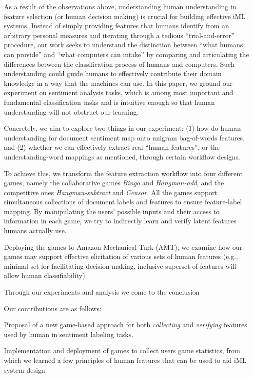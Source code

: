 \documentclass[chi_draft]{sigchi}
\begin{document}
As a result of the observations above, understanding human understanding in feature selection (or human decision making) is crucial for building effective iML systems. Instead of simply providing features that humans identify from an arbitrary personal measures and iterating through a tedious ``trial-and-error'' procedure, our work seeks to understand the distinction between ``what humans can provide'' and ``what computers can intake'' by comparing and articulating the differences between the classification process of humans and computers. Such understanding could guide humans to effectively contribute their domain knowledge in a way that the machines can use. In this paper, we ground our experiment on sentiment analysis tasks, which is among most important and fundamental classification tasks and is intuitive enough so that human understanding will not obstruct our learning.

Concretely, we aim to explore two things in our experiment: (1) how do human understanding for document sentiment map onto unigram bag-of-words features, and (2) whether we can effectively extract real ``human features'', or the understanding-word mappings as mentioned, through certain workflow designs.

To achieve this, we transform the feature extraction workflow into four different games, namely the collaborative games \emph{Bingo} and \emph{Hangman-add}, and the competitive ones \emph{Hangman-subtract} and \emph{Censor}.
All the games support simultaneous collections of document labels and features to ensure feature-label mapping.
By manipulating the users' possible inputs and their access to information in each game, we try to indirectly learn and verify latent features humans actually use. 

Deploying the games to Amazon Mechanical Turk (AMT), we examine how our games may support effective elicitation of various sets of human features (e.g., minimal set for facilitating decision making, inclusive superset of features will allow human classifiability). 

Through our experiments and analysis we come to the conclusion 

Our contributions are as follows:
\begin{compactitem}
	\item Proposal of a new game-based approach for both \emph{collecting} and \emph{verifying} features used by human in sentiment labeling tasks.
  \item Implementation and deployment of games to collect users game statistics, from which we learned a few principles of human features that can be used to aid iML system design.
  \item {} 
\end{compactitem}
\end{document}
